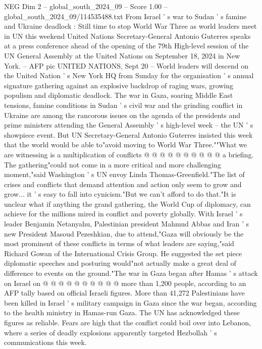 \begin{textsample}{NEG Dim 2 – global\_south\_2024\_09 – Score 1.00 – global\_south\_2024\_09/114535488.txt}  \label{ex:f2_neg_250}
From Israel ' s war to Sudan ' s famine and Ukraine deadlock : Still time to stop World War Three as world leaders meet in UN this weekend United Nations Secretary-General Antonio Guterres speaks at a press conference ahead of the opening of the 79th High-level session of the UN General Assembly at the United Nations on September 18, 2024 in New York. -- AFP pic UNITED NATIONS, Sept 20 -- World leaders will descend on the United Nation ' s New York HQ from Sunday for the organisation ' s annual signature gathering against an explosive backdrop of raging wars, growing populism and diplomatic deadlock.
The war in Gaza, soaring Middle East tensions, famine conditions in Sudan ' s civil war and the grinding conflict in Ukraine are among the rancorous issues on the agenda of the presidents and prime ministers attending the General Assembly ' s high-level week -- the UN ' s showpiece event.
But UN Secretary-General Antonio Guterres insisted this week that the world would be able to"avoid moving to World War Three.""What we are witnessing is a multiplication of conflicts @ @ @ @ @ @ @ @ @ @ a briefing.
The gathering"could not come in a more critical and more challenging moment,"said Washington ' s UN envoy Linda Thomas-Greenfield."The list of crises and conflicts that demand attention and action only seem to grow and grow... it ' s easy to fall into cynicism."But we can't afford to do that."It is unclear what if anything the grand gathering, the World Cup of diplomacy, can achieve for the millions mired in conflict and poverty globally.
With Israel ' s leader Benjamin Netanyahu, Palestinian president Mahmud Abbas and Iran ' s new President Masoud Pezeshkian, due to attend,"Gaza will obviously be the most prominent of these conflicts in terms of what leaders are saying,"said Richard Gowan of the International Crisis Group.
He suggested the set piece diplomatic speeches and posturing would"not actually make a great deal of difference to events on the ground."The war in Gaza began after Hamas ' s attack on Israel on @ @ @ @ @ @ @ @ @ @ more than 1,200 people, according to an AFP tally based on official Israeli figures.
More than 41,272 Palestinians have been killed in Israel ' s military campaign in Gaza since the war began, according to the health ministry in Hamas-run Gaza.
The UN has acknowledged these figures as reliable.
Fears are high that the conflict could boil over into Lebanon, where a series of deadly explosions apparently targeted Hezbollah ' s communications this week.

\end{textsample}

